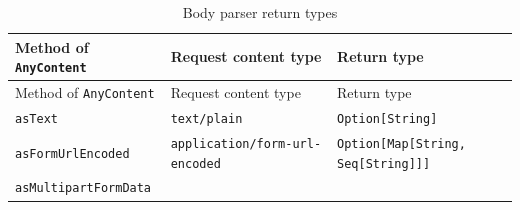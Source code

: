 \documentclass[oneside,11pt,a4paper,]{book}
\begin{document}
\begin{longtable}[c]{@{}lll@{}}
\caption{Body parser return types}\tabularnewline
\toprule
\begin{minipage}[b]{0.29\columnwidth}\raggedright\strut
Method of \texttt{AnyContent}
\strut\end{minipage} &
\begin{minipage}[b]{0.29\columnwidth}\raggedright\strut
Request content type
\strut\end{minipage} &
\begin{minipage}[b]{0.33\columnwidth}\raggedright\strut
Return type
\strut\end{minipage}\tabularnewline
\midrule
\endfirsthead
\toprule
\begin{minipage}[b]{0.29\columnwidth}\raggedright\strut
Method of \texttt{AnyContent}
\strut\end{minipage} &
\begin{minipage}[b]{0.29\columnwidth}\raggedright\strut
Request content type
\strut\end{minipage} &
\begin{minipage}[b]{0.33\columnwidth}\raggedright\strut
Return type
\strut\end{minipage}\tabularnewline
\midrule
\endhead
\begin{minipage}[t]{0.29\columnwidth}\raggedright\strut
\texttt{asText}
\strut\end{minipage} &
\begin{minipage}[t]{0.29\columnwidth}\raggedright\strut
\texttt{text/plain}
\strut\end{minipage} &
\begin{minipage}[t]{0.33\columnwidth}\raggedright\strut
\texttt{Option{[}String{]}}
\strut\end{minipage}\tabularnewline
\begin{minipage}[t]{0.29\columnwidth}\raggedright\strut
\texttt{asFormUrlEncoded}
\strut\end{minipage} &
\begin{minipage}[t]{0.29\columnwidth}\raggedright\strut
\texttt{application/form-url-encoded}
\strut\end{minipage} &
\begin{minipage}[t]{0.33\columnwidth}\raggedright\strut
\texttt{Option{[}Map{[}String, Seq{[}String{]}{]}{]}}
\strut\end{minipage}\tabularnewline
\begin{minipage}[t]{0.29\columnwidth}\raggedright\strut
\texttt{asMultipartFormData}
\strut\end{minipage} &

\end{longtable}
\end{document}
